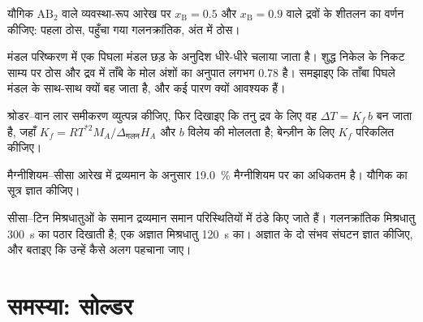 \begin{exercise}[$\star\star$]\label{exo:b2:solid-liquid-diagrams:8}
यौगिक $\mathrm{AB_2}$ वाले व्यवस्था-रूप आरेख पर $x_{\mathrm B} = 0.5$ और
$x_{\mathrm B} = 0.9$ वाले द्रवों के शीतलन का वर्णन कीजिए: पहला
ठोस, पहुँचा गया गलनक्रांतिक, अंत में ठोस।
\end{exercise}

\begin{exercise}[$\star\star$]\label{exo:b2:solid-liquid-diagrams:9}
मंडल परिष्करण में एक पिघला मंडल छड़ के अनुदिश धीरे-धीरे चलाया जाता है। शुद्ध निकेल के निकट
साम्य पर ठोस और द्रव में ताँबे के मोल अंशों का अनुपात लगभग
0.78 है। समझाइए कि ताँबा पिघले मंडल के साथ-साथ क्यों बह जाता है,
और कई पारण क्यों आवश्यक हैं।
\end{exercise}

\begin{exercise}[$\star\star\star$]\label{exo:b2:solid-liquid-diagrams:10}
श्रोडर--वान लार समीकरण व्युत्पन्न कीजिए, फिर दिखाइए कि तनु द्रव के लिए
वह $\Delta T = K_f\,b$ बन जाता है, जहाँ $K_f = RT^{*2}M_A/\Delta_{\text{गलन}}H_A$
और $b$ विलेय की मोललता है; बेन्ज़ीन के लिए $K_f$ परिकलित कीजिए।
\end{exercise}

\begin{exercise}[$\star\star\star$]\label{exo:b2:solid-liquid-diagrams:11}
मैग्नीशियम--सीसा आरेख में द्रव्यमान के अनुसार 19.0~\% मैग्नीशियम पर  का
अधिकतम है। यौगिक का सूत्र ज्ञात कीजिए।
\end{exercise}

\begin{exercise}[$\star\star\star$]\label{exo:b2:solid-liquid-diagrams:12}
सीसा--टिन मिश्रधातुओं के समान द्रव्यमान समान परिस्थितियों में ठंडे किए जाते हैं।
गलनक्रांतिक मिश्रधातु \qty{300}{s} का पठार दिखाती है; एक अज्ञात मिश्रधातु
\qty{120}{s} का। अज्ञात के दो संभव संघटन ज्ञात कीजिए, और बताइए कि उन्हें
कैसे अलग पहचाना जाए।
\end{exercise}

\section{समस्या: सोल्डर}

